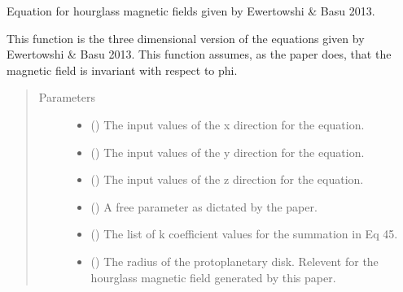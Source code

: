 \documentclass[letterpaper,10pt,english]{sphinxmanual}
\begin{document}
\begin{fulllineitems}
\label{\detokenize{magnetic_field_functions_3d:magnetic_field_functions_3d.hourglass_magnetic_field_cart_3d}}
Equation for hourglass magnetic fields given by Ewertowshi \& Basu 2013.

This function is the three dimensional version of the equations given by
Ewertowshi \& Basu 2013. This function assumes, as the paper does, that the
magnetic field is invariant with respect to phi.
\begin{quote}\begin{description}
\item[{Parameters}] \leavevmode\begin{itemize}
\item {} 
 () \textendash{} The input values of the x direction for the equation.

\item {} 
 () \textendash{} The input values of the y direction for the equation.

\item {} 
 () \textendash{} The input values of the z direction for the equation.

\item {} 
 () \textendash{} A free parameter as dictated by the paper.

\item {} 
 () \textendash{} The list of k coefficient values for the summation in Eq 45.

\item {} 
 () \textendash{} The radius of the protoplanetary disk. Relevent for the hourglass
magnetic field generated by this paper.


\end{itemize}
\end{description}
\end{quote}
\end{fulllineitems}
\end{document}
